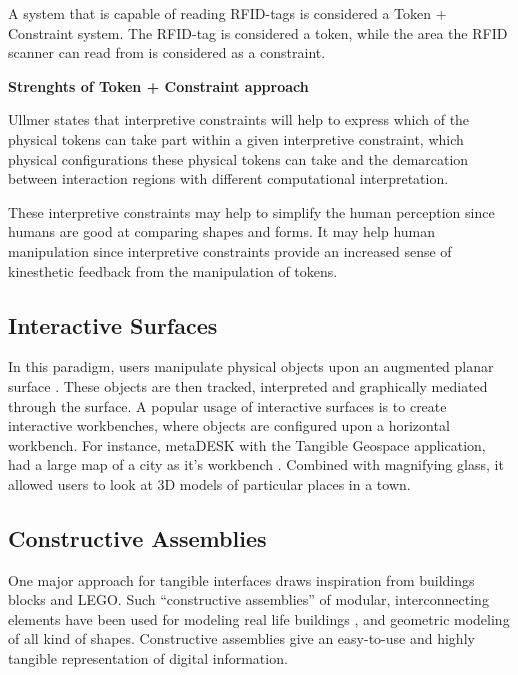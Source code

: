 A system that is capable of reading RFID-tags is considered a Token + Constraint system. The RFID-tag is considered a token, while the area the RFID scanner can read from is considered as a constraint.  




\textbf{Strenghts of Token + Constraint approach}

Ullmer states that interpretive constraints will help to express which of the physical tokens can take part within a given interpretive constraint, which physical configurations these physical tokens can take and the demarcation between interaction regions with different computational interpretation.

These interpretive constraints may help to simplify the human perception since humans are good at comparing shapes and forms. 
It may help human manipulation since interpretive constraints provide an increased sense of kinesthetic feedback from the manipulation of tokens. 

\subsection{Interactive Surfaces}
\label{sec:interactivesurfaces}
In this paradigm, users manipulate physical objects upon an augmented planar surface \cite{ullmer2002tangible}. These objects are then tracked, interpreted and graphically mediated through the surface. A popular usage of interactive surfaces is to create interactive workbenches, where objects are configured upon a horizontal workbench. For instance, metaDESK with the Tangible Geospace application, had a large map of a city as it's workbench \cite{ullmer1997metadesk}. Combined with magnifying glass, it allowed users to look at 3D models of particular places in a town. 



\subsection{Constructive Assemblies}
\label{sec:constructiveassemblies}
One major approach for tangible interfaces draws inspiration from buildings blocks and LEGO\texttrademark. Such ``constructive assemblies'' of modular, interconnecting elements have been used for modeling real life buildings \cite{aish1984architecture}, and geometric modeling of all kind of shapes\cite{anderson2000tangible}. Constructive assemblies give an easy-to-use and highly tangible representation of digital information. 

